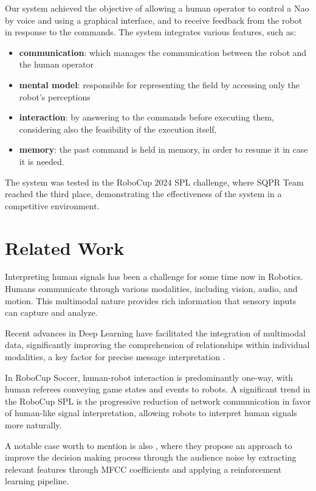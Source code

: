 \documentclass[a4paper, onecolumn, 12pt]{article}
\begin{document}
Our system achieved the objective of allowing a human operator to control a Nao
by voice and using a graphical interface, and to receive feedback from the robot
in response to the commands. The system integrates various features, such as:
\begin{itemize}
    \item \textbf{communication}: which manages the communication between the robot and
    the human operator
    \item \textbf{mental model}: responsible for representing the field by
    accessing only the robot's perceptions
    \item \textbf{interaction}: by answering to the commands before executing
    them, considering also the feasibility of the execution itself,
    \item \textbf{memory}: the past command is held in memory, in order to
    resume it in case it is needed.
\end{itemize}
The system was tested in the RoboCup 2024 SPL challenge, where SQPR Team reached
the third place, demonstrating the effectiveness of the system in a competitive
environment.

\newpage

\section{Related Work}
\label{sec:rel}

Interpreting human signals has been a challenge for some time now in Robotics.
Humans communicate through various modalities, including vision, audio, and
motion. This multimodal nature provides rich information that sensory inputs can
capture and analyze. 

Recent advances in Deep Learning have facilitated the
integration of multimodal data, significantly improving the comprehension of
relationships within individual modalities, a key factor for precise message
interpretation \cite{LIU20183} \cite{su2023recent}.

In RoboCup Soccer, human-robot interaction is predominantly one-way, with human
referees conveying game states and events to robots. A significant trend in the
RoboCup SPL is the progressive reduction of network communication in
favor of human-like signal interpretation, allowing robots to interpret human
signals more naturally. \cite{digiambattista}

A notable case worth to mention is also \cite{antonioni}, where they propose an
approach to improve the decision making process through the audience noise by
extracting relevant features through MFCC coefficients and applying a
reinforcement learning pipeline. 
\end{document}
